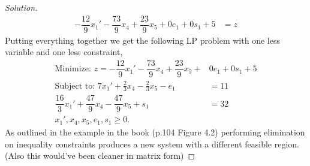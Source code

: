 \documentclass[12pt]{article}
\makeatletter
\theoremstyle{homework}
\newenvironment{exercise}[1]
{\def\@currentlabel{#1}\exercisecore}
{\endexercisecore}
\makeatother
\begin{document}
\begin{exercise}{2.4}
\begin{proof}[Solution]
\begin{align*}
      -\dfrac{12}{9}x_1' - \dfrac{73}{9}x_4 + \dfrac{23}{9}x_5 + 0e_1 + 0s_1 + 5 &= z
    \end{align*}
    Putting everything together we get the following LP problem with one less variable and one less constraint, 
    \begin{align*}
      \text{Minimize: } z = -\dfrac{12}{9}x_1' - \dfrac{73}{9}x_4 + \dfrac{23}{9}x_5 + &0e_1 + 0s_1 + 5\\
      \text{Subject to: }7x_1' + \frac{2}{3}x_4 - \frac{2}{3}x_5 - e_1 &= 11\\
      \dfrac{16}{3}x_1' + \dfrac{47}{9}x_4 - \dfrac{47}{9}x_5 + s_1 &= 32\\
      x_1', x_4, x_5, e_1, s_1 \geq 0.
    \end{align*}
    As outlined in the example in the book (p.104 Figure 4.2) performing elimination on inequality constraints 
    produces a new system with a different feasible region. (Also this would've been cleaner in matrix form)      
 \end{proof}
\end{exercise}
\vspace{.5in}
\end{document}
